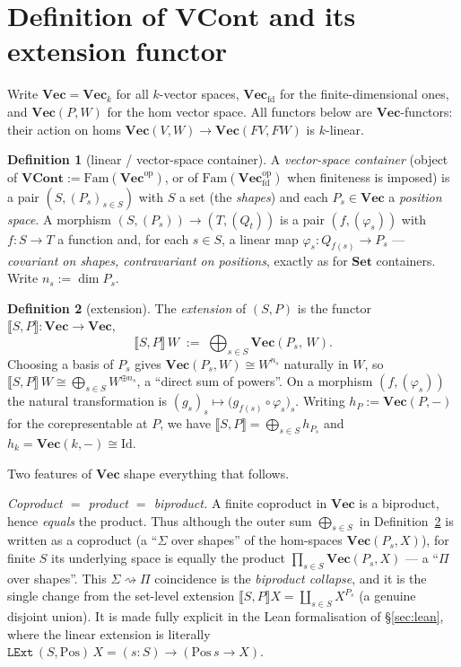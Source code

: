 \documentclass[11pt]{article}
\theoremstyle{plain}
\theoremstyle{definition}
\newtheorem{definition}{Definition}
\theoremstyle{remark}
\newcommand{\Set}{\mathbf{Set}}
\newcommand{\Vect}{\mathbf{Vec}}
\newcommand{\Vecfd}{\mathbf{Vec}_{\mathrm{fd}}}
\newcommand{\Fam}{\mathrm{Fam}}
\newcommand{\ext}[1]{\llbracket #1 \rrbracket}
\newcommand{\op}{\mathrm{op}}
\DeclareMathOperator{\dm}{dim}
\begin{document}
\section{Definition of $\mathbf{VCont}$ and its extension functor}
\label{sec:def}

Write $\Vect=\Vect_k$ for all $k$-vector spaces, $\Vecfd$ for the finite-dimensional ones, and
$\Vect(P,W)$ for the hom vector space. All functors below are $\Vect$-functors: their action on
homs $\Vect(V,W)\to\Vect(FV,FW)$ is $k$-linear.

\begin{definition}[linear / vector-space container]
\label{def:vcont}
A \emph{vector-space container} (object of $\mathbf{VCont}:=\Fam(\Vect^\op)$, or of
$\Fam(\Vecfd^\op)$ when finiteness is imposed) is a pair $(S,(P_s)_{s\in S})$ with $S$ a set (the
\emph{shapes}) and each $P_s\in\Vect$ a \emph{position space}. A morphism
$(S,(P_s))\to(T,(Q_t))$ is a pair $(f,(\varphi_s))$ with $f\colon S\to T$ a function and, for each
$s\in S$, a linear map $\varphi_s\colon Q_{f(s)}\to P_s$ --- \emph{covariant on shapes, contravariant
on positions}, exactly as for $\Set$ containers. Write $n_s:=\dm P_s$.
\end{definition}

\begin{definition}[extension]
\label{def:ext}
The \emph{extension} of $(S,P)$ is the functor $\ext{S,P}\colon\Vect\to\Vect$,
\[
   \ext{S,P}\,W \;:=\; \bigoplus_{s\in S}\Vect(P_s,\,W).
\]
Choosing a basis of $P_s$ gives $\Vect(P_s,W)\cong W^{n_s}$ naturally in $W$, so
$\ext{S,P}\,W\cong\bigoplus_{s\in S} W^{\oplus n_s}$, a ``direct sum of powers''. On a morphism
$(f,(\varphi_s))$ the natural transformation is $(g_s)_s\mapsto\bigl(g_{f(s)}\circ\varphi_s\bigr)_s$.
Writing $h_P:=\Vect(P,-)$ for the corepresentable at $P$, we have
$\ext{S,P}=\bigoplus_{s\in S}h_{P_s}$ and $h_k=\Vect(k,-)\cong\mathrm{Id}$.
\end{definition}

Two features of $\Vect$ shape everything that follows.

\emph{Coproduct $=$ product $=$ biproduct.} A finite coproduct in $\Vect$ is a biproduct, hence
\emph{equals} the product. Thus although the outer sum $\bigoplus_{s\in S}$ in Definition~\ref{def:ext}
is written as a coproduct (a ``$\Sigma$ over shapes'' of the hom-spaces $\Vect(P_s,X)$), for finite
$S$ its underlying space is equally the product $\prod_{s\in S}\Vect(P_s,X)$ --- a ``$\Pi$ over
shapes''. This $\Sigma\!\rightsquigarrow\!\Pi$ coincidence is the \emph{biproduct collapse}, and it
is the single change from the set-level extension $\ext{S,P}X=\coprod_{s\in S}X^{P_s}$ (a genuine
disjoint union). It is made fully explicit in the Lean formalisation of \S\ref{sec:lean}, where the
linear extension is literally $\mathtt{LExt}\,(S,\mathrm{Pos})\,X=(s:S)\to(\mathrm{Pos}\,s\to X)$.
\end{document}
